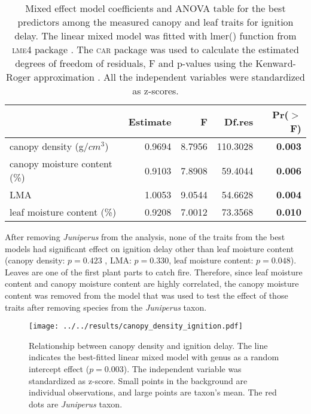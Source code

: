\documentclass{ttuthes2007}
\newcommand{\pkg}[1]{\textsc{#1}}
\begin{document}
\begin{table}[ht]
  \centering
  \caption{Mixed effect model coefficients and ANOVA table for the best
    predictors among the measured canopy and leaf traits for ignition delay.
    The linear mixed model was fitted with lmer() function from \pkg{lme4}
    package \citep{bates2009package}. The \pkg{car} package
    \citep{fox2013hypothesis} was used to calculate the estimated degrees of
    freedom of residuals, F and p-values using the Kenward-Roger approximation
    \citep{kenward1997small}. All the independent variables were standardized
    as z-scores.}
  \begin{tabular}{lrrrr}
    \toprule
    & Estimate & F & Df.res & Pr($>$F) \\ 
    \midrule
    canopy density (g/{$cm^3$}) & 0.9694 & 8.7956  & 110.3028 & \textbf{0.003} \\ 
    canopy moisture content (\%) & 0.9103 & 7.8908 & 59.4044 & \textbf{0.006} \\ 
    LMA & 1.0053 & 9.0544  & 54.6628 & \textbf{0.004} \\  
    leaf moisture content (\%) & 0.9208 & 7.0012  & 73.3568 & \textbf{0.010} \\ 
    \bottomrule
  \end{tabular}
  \label{tab:fandpforig_delay}
\end{table}

After removing \emph{Juniperus} from the analysis, %
none of the traits from the best models had significant effect on ignition delay other than leaf moisture content (canopy density: $p = 0.423$ , 
LMA: $p = 0.330$, leaf moisture content: $p = 0.048$). Leaves are one of the first plant parts to catch fire. Therefore, since leaf moisture content and canopy moisture content are highly correlated, the canopy moisture content was removed from the model that was used to test the effect of those traits after removing species from the \emph{Juniperus} taxon.






\begin{figure}[ht]
    \centering
    \texttt{[image: ../../results/canopy\_density\_ignition.pdf]}
    \caption{Relationship between canopy density and ignition delay. The line indicates the best-fitted linear mixed model with genus as a random intercept effect ($p  = 0.003$). The independent variable was standardized  as z-score. Small points in the background are individual observations, and large points are taxon's mean. The red dots are \emph{Juniperus} taxon.}
    \label{fig:canopy_density_ig_delay}
\end{figure}
\end{document}
